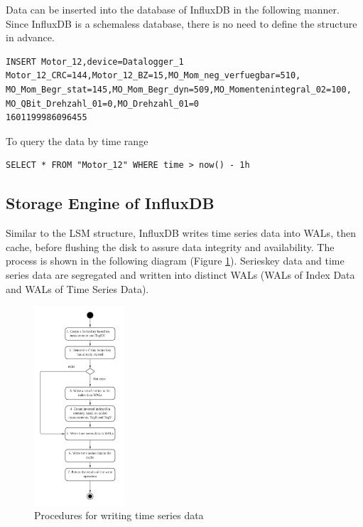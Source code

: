 Data can be inserted into the database of InfluxDB in the following manner. Since InfluxDB is a schemaless database, there is no need to define the structure in advance.

\begin{verbatim}
INSERT Motor_12,device=Datalogger_1 Motor_12_CRC=144,Motor_12_BZ=15,MO_Mom_neg_verfuegbar=510,
MO_Mom_Begr_stat=145,MO_Mom_Begr_dyn=509,MO_Momentenintegral_02=100,
MO_QBit_Drehzahl_01=0,MO_Drehzahl_01=0 
1601199986096455
\end{verbatim}

To query the data by time range
\begin{verbatim}
SELECT * FROM "Motor_12" WHERE time > now() - 1h
\end{verbatim}

\subsection{Storage Engine of InfluxDB}
Similar to the LSM structure, InfluxDB writes time series data into WALs, then cache, before flushing the disk to assure data integrity and availability. The process is shown in the following diagram (Figure \ref{fig:procedures_influxdb}). Serieskey data and time series data are segregated and written into distinct WALs (WALs of Index Data and WALs of Time Series Data). 

\begin{figure}[hbt!]
	\centering
 	\includegraphics[width=0.3\textwidth]{gfx/procedure_influxdb.png}
	\caption{Procedures for writing time series data}
	\label{fig:procedures_influxdb}
\end{figure}

